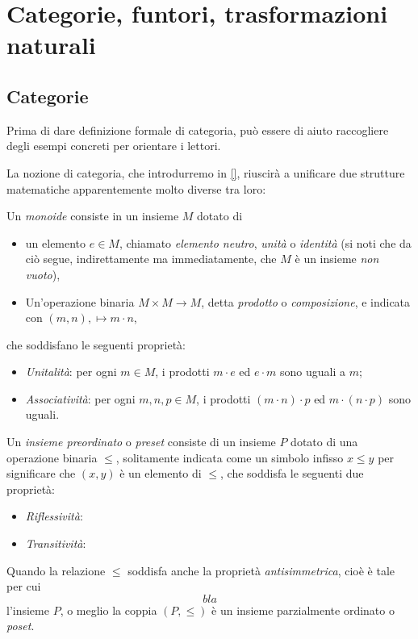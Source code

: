 \chapter{Categorie, funtori, trasformazioni naturali}

\section{Categorie}\label{categorie}

Prima di dare definizione formale di categoria, può essere di aiuto raccogliere degli esempi concreti per orientare i lettori.

La nozione di categoria, che introdurremo in \autoref{}, riuscirà a unificare due strutture matematiche apparentemente molto diverse tra loro:
\begin{definition}
    Un \emph{monoide} consiste in un insieme $M$ dotato di
    \begin{itemize}
     \item un elemento $e\in M$, chiamato \emph{elemento neutro}, \emph{unità} o \emph{identità} (si noti che da ciò segue, indirettamente ma immediatamente, che $M$ è un insieme \emph{non vuoto}),
     \item Un'operazione binaria $M\times M\to M$, detta \emph{prodotto} o \emph{composizione}, e indicata con $(m,n),\mapsto m\cdot n$,
    \end{itemize}
    che soddisfano le seguenti proprietà:
    \begin{itemize}
     \item \emph{Unitalità}: per ogni $m\in M$, i prodotti $m \cdot e$ ed $e\cdot m$ sono uguali a $m$;
     \item \emph{Associatività}: per ogni $m,n,p\in M$, i prodotti $(m\cdot n)\cdot p$ ed $m\cdot (n\cdot p)$ sono uguali.
    \end{itemize}
   \end{definition}
\begin{definition}
    Un \emph{insieme preordinato} o \emph{preset} consiste di un insieme $P$ dotato di una operazione binaria $\le$, solitamente indicata come un simbolo infisso $x\le y$ per significare che $(x,y)$ è un elemento di $\le$, che soddisfa le seguenti due proprietà:
    \begin{itemize}
        \item \emph{Riflessività}: \Todo{}
        \item \emph{Transitività}: \Todo{}
    \end{itemize}
    Quando la relazione $\le$ soddisfa anche la proprietà \emph{antisimmetrica}, cioè è tale per cui
    \[bla\]
    l'insieme $P$, o meglio la coppia $(P,\le)$ è un insieme parzialmente ordinato o \emph{poset}.
\end{definition}
